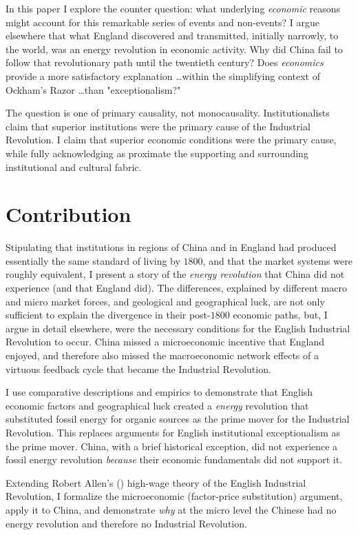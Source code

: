 \documentclass[12pt]{article}
\numberwithin{equation}{section}
\begin{document}
	In this paper I explore the counter question: what underlying \textit{economic} reasons might account for this remarkable series of events and non-events? I argue elsewhere that what England discovered and transmitted, initially  narrowly, to the world, was an energy revolution in economic activity. Why did China fail to follow that revolutionary path until the twentieth century? Does \textit{economics} provide a more satisfactory explanation \ldots within the simplifying context of Ockham's Razor \ldots than "exceptionalism?"
	
	The question is one of primary causality, not monocausality. Institutionalists claim that superior institutions were the primary cause of the Industrial Revolution. I claim that superior economic conditions were the primary cause, while fully acknowledging as proximate the supporting and surrounding institutional and cultural fabric.	
	
	\section*{Contribution}
	Stipulating that institutions in regions of China and in England had produced essentially the same standard of living by $1800$, and that the market systems were roughly equivalent, I present a story of the \textit{energy revolution} that China did not experience (and that England did). The differences, explained by different macro and micro market forces, and geological and geographical luck, are not only sufficient to explain the divergence in their post-$1800$ economic paths, but, I argue in detail elsewhere, were the necessary conditions for the English Industrial Revolution to occur. China missed a microeconomic incentive that England enjoyed, and therefore also missed the macroeconomic network effects of a virtuous feedback cycle that became the Industrial Revolution. 
	
	I use comparative descriptions and empirics to demonstrate that English economic factors and geographical luck created a \textit{energy} revolution that substituted fossil energy for organic sources as the prime mover for the Industrial Revolution. This replaces arguments for English institutional exceptionalism as the prime mover. China, with a brief historical exception, did not experience a fossil energy revolution \textit{because} their economic fundamentals did not support it.
	
	Extending Robert Allen's (\citeyear{allen_british_2009}) high-wage theory of the English Industrial Revolution, I formalize the microeconomic (factor-price substitution) argument, apply it to China, and demonstrate \textit{why} at the micro level the Chinese had no energy revolution and therefore no Industrial Revolution. 
	
\end{document}

